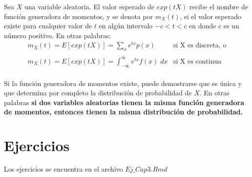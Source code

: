 \begin{tcolorbox}[colframe = white]
    \begin{def.}
	Sea $X$ una variable aleatoria. El valor esperado de $exp(tX)$ recibe el nombre de función generadora de momentos, y se denota por $m_X(t)$, si el valor esperado existe para cualquier valor de $t$ en algún intervalo $-c<t<c$ en donde $c$ es un número positivo. En otras palabras:
	$$\begin{array}{ll}
	    m_X(t) = E[exp(tX)] = \sum\limits_x e^{tx} p(x) & \mbox{si X es discreta, o}\\\\
	    m_X(t) = E[exp(tX)] = \displaystyle\int_{-\infty}^\infty e^{tx} f(x) \; dx & \mbox{si X es continua}\\
	\end{array}$$
    \end{def.}
\end{tcolorbox}
Si la función generadora de momentos existe, puede demostrarse que es única y que determina por completo la distribución de probabilidad de $X$. En otras palabras \textbf{si dos variables aleatorias tienen la misma función generadora de momentos, entonces tienen la misma distribución de probabilidad.}











\section{Ejercicios}

Los ejercicios se encuentra en el archivo $Ej\_Cap3.Rmd$

